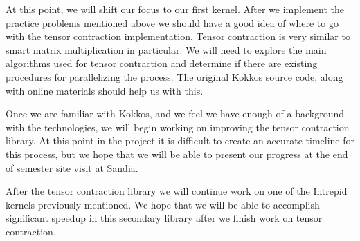 \documentclass[proposal]{hmcclinic}
\begin{document}
At this point, we will shift our focus to our first kernel.  After we implement
the practice problems mentioned above we should have a good idea of where to go
with the tensor contraction implementation. Tensor contraction is very similar
to smart matrix multiplication in particular.  We will need to explore the main
algorithms used for tensor contraction and determine if there are existing
procedures for parallelizing the process. The original Kokkos source code, along
with online materials should help us with this.

Once we are familiar with Kokkos, and we feel we have enough of a background
with the technologies, we will begin working on improving the tensor contraction
library. At this point in the project it is difficult to create an accurate
timeline for this process, but we hope that we will be able to present our
progress at the end of semester site visit at Sandia.

After the tensor contraction library we will continue work on one of the
Intrepid kernels previously mentioned. We hope that we will be able to
accomplish significant speedup in this secondary library after we finish work on
tensor contraction.







\end{document}
